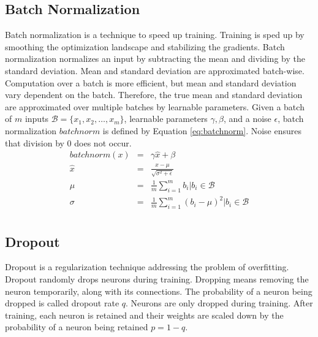 \subsection{Batch Normalization}
Batch normalization is a technique to speed up training. Training is sped up by smoothing the optimization landscape and stabilizing the gradients. \autocite{Santurkar.2018}
Batch normali\-zation normalizes an input by subtracting the mean and dividing by the standard deviation. Mean and standard deviation are approximated batch-wise. Computation over a batch is more efficient, but mean and standard deviation vary dependent on the batch. Therefore, the true mean and standard deviation are approximated over multiple batches by learnable parameters. Given a batch of $m$ inputs $\mathcal{B} = \{x_1, x_2, \dots, x_m \}$, learnable parameters $\gamma, \beta$, and a noise $\epsilon$, batch normalization $batchnorm$ is defined by Equation \eqref{eq:batchnorm}. \autocite{Ioffe.2015} Noise ensures that division by $0$ does not occur.
\begin{equation}
	\label{eq:batchnorm}
	\begin{array}{lcl}
		batchnorm(x) & = & \gamma \hat{x} + \beta \\
		\hat{x} & = & \frac{x-\mu}{\sqrt{\sigma^2+\epsilon}}\\
		\mu & = & \frac{1}{m} \sum_{i=1}^{m} b_i | b_i \in \mathcal{B}\\
		\sigma & = & \frac{1}{m} \sum_{i=1}^{m} (b_i-\mu)^2 | b_i \in \mathcal{B}\\
	\end{array}
\end{equation}

\subsection{Dropout}
Dropout is a regularization technique addressing the problem of overfitting. 
Dropout randomly drops neurons during training. Dropping means removing the neuron temporarily, along with its connections. The probability of a neuron being dropped is called dropout rate $q$. Neurons are only dropped during training. After training, each neuron is retained and their weights are scaled down by the probability of a neuron being retained $p=1-q$.\autocite{Srivastava.2014}





